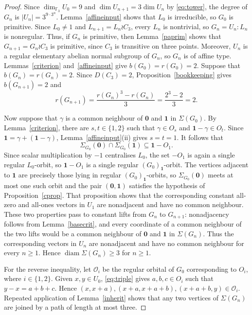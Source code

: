 \documentclass[a4paper,reqno,11pt]{amsart}
\newcommand\F{\mathbb{F}}
\newcommand\diam{\operatorname{diam}}
\numberwithin{equation}{section}
\begin{document}
\begin{proof}
Since $\dim_{\F_3}U_0=9$ and $\dim U_{n+1}=3\dim U_n$ by \eqref{eq:tower}, the degree of $G_n$ is $|U_n|=3^{9\cdot3^n}$. Lemma~\ref{affineinput} shows that $L_0$ is irreducible, so $G_0$ is primitive. Since $L_0\ne1$ and $L_{n+1}=L_n\wr C_3$, every $L_n$ is nontrivial, so $G_n=U_n{:}L_n$ is nonregular. Thus, if $G_n$ is primitive, then Lemma~\ref{paprim} shows that $G_{n+1}=G_n\wr C_3$ is primitive, since $C_3$ is transitive on three points. Moreover, $U_n$ is a regular elementary abelian normal subgroup of $G_n$, so $G_n$ is of affine type. Lemmas~\ref{criterion} and~\ref{affineinput} give $b(G_0)=r(G_0)=2$. Suppose that $b(G_n)=r(G_n)=2$. Since $D(C_3)=2$, Proposition~\ref{bookkeeping} gives $b(G_{n+1})=2$ and
\[
r(G_{n+1})=\frac{r(G_n)^3-r(G_n)}{3}=\frac{2^3-2}{3}=2.
\]

Now suppose that $\gamma$ is a common neighbour of $\mathbf0$ and $\mathbf1$ in $\Sigma(G_0)$. By Lemma~\ref{criterion}, there are $s,t\in\{1,2\}$ such that $\gamma\in O_s$ and $\mathbf1-\gamma\in O_t$. Since $\mathbf1=\gamma+(\mathbf1-\gamma)$, Lemma~\ref{affineinput}(ii) gives $s=t=1$. It follows that
\[
\Sigma_{G_0}(\mathbf0)\cap\Sigma_{G_0}(\mathbf1)\subseteq\mathbf1-O_1.
\]
Since scalar multiplication by $-1$ centralises $L_0$, the set $-O_1$ is again a single regular $L_0$-orbit, so $\mathbf1-O_1$ is a single regular $(G_0)_{\mathbf1}$-orbit. The vertices adjacent to $\mathbf1$ are precisely those lying in regular $(G_0)_{\mathbf1}$-orbits, so $\Sigma_{G_0}(\mathbf0)$ meets at most one such orbit and the pair $(\mathbf0,\mathbf1)$ satisfies the hypothesis of Proposition~\ref{cprop}. That proposition shows that the corresponding constant all-zero and all-ones vectors in $U_1$ are nonadjacent and have no common neighbour. These two properties pass to constant lifts from $G_n$ to $G_{n+1}$: nonadjacency follows from Lemma~\ref{basecrit}, and every coordinate of a common neighbour of the two lifts would be a common neighbour of $\mathbf0$ and $\mathbf1$ in $\Sigma(G_n)$. Thus the corresponding vectors in $U_n$ are nonadjacent and have no common neighbour for every $n\ge1$. Hence $\diam\Sigma(G_n)\ge3$ for $n\ge1$.

For the reverse inequality, let $\mathcal O_i$ be the regular orbital of $G_0$ corresponding to $O_i$, where $i\in\{1,2\}$. Given $x,y\in U_0$, \eqref{eq:triple} gives $a,b,c\in O_i$ such that $y-x=a+b+c$. Hence $(x,x+a),(x+a,x+a+b),(x+a+b,y)\in\mathcal O_i$. Repeated application of Lemma~\ref{inherit} shows that any two vertices of $\Sigma(G_n)$ are joined by a path of length at most three.
\end{proof}
\end{document}
